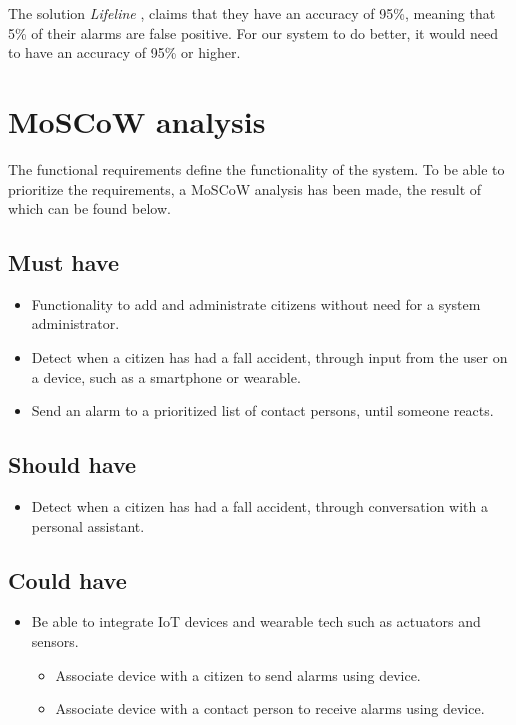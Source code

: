 The solution \textit{Lifeline} \cite{AAlert}, claims that they have an accuracy of 95\%, meaning that 5\% of their alarms are false positive. For our system to do better, it would need to have an accuracy of 95\% or higher.


\section{MoSCoW analysis}
The functional requirements define the functionality of the system. To be able to prioritize the requirements, a MoSCoW analysis has been made, the result of which can be found below. 

\subsection{Must have}

\begin{itemize}
    \item Functionality to add and administrate citizens without need for a system administrator.
    \item Detect when a citizen has had a fall accident, through input from the user on a device, such as a smartphone or wearable.
    \item Send an alarm to a prioritized list of contact persons, until someone reacts.
\end{itemize}

\subsection{Should have}

\begin{itemize}
    \item Detect when a citizen has had a fall accident, through conversation with a personal assistant.
\end{itemize}

\subsection{Could have}
\begin{itemize}
    \item Be able to integrate IoT devices and wearable tech such as actuators and sensors.
        \begin{itemize}
            \item Associate device with a citizen to send alarms using device.
            \item Associate device with a contact person to receive alarms using device.
        \end{itemize}
\end{itemize}

